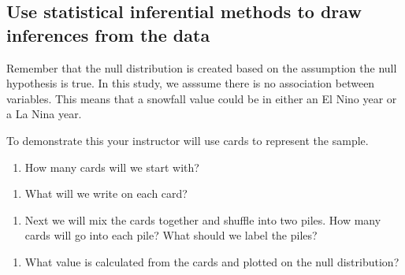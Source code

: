 \documentclass[
]{report}
\providecommand{\tightlist}{%
  \setlength{\itemsep}{0pt}\setlength{\parskip}{0pt}}
\begin{document}
\vspace{0.5in}

\hypertarget{use-statistical-inferential-methods-to-draw-inferences-from-the-data}{%
\subsection{Use statistical inferential methods to draw inferences from the data}\label{use-statistical-inferential-methods-to-draw-inferences-from-the-data}}

Remember that the null distribution is created based on the assumption the null hypothesis is true. In this study, we asssume there is no association between variables. This means that a snowfall value could be in either an El Nino year or a La Nina year.

To demonstrate this your instructor will use cards to represent the sample.

\begin{enumerate}
\def\labelenumi{\arabic{enumi}.}
\setcounter{enumi}{9}
\tightlist
\item
  How many cards will we start with?
\end{enumerate}

\vspace{0.5in}

\begin{enumerate}
\def\labelenumi{\arabic{enumi}.}
\setcounter{enumi}{10}
\tightlist
\item
  What will we write on each card?
\end{enumerate}

\vspace{0.5in}

\begin{enumerate}
\def\labelenumi{\arabic{enumi}.}
\setcounter{enumi}{11}
\tightlist
\item
  Next we will mix the cards together and shuffle into two piles. How many cards will go into each pile? What should we label the piles?
\end{enumerate}

\vspace{1in}

\begin{enumerate}
\def\labelenumi{\arabic{enumi}.}
\setcounter{enumi}{12}
\tightlist
\item
  What value is calculated from the cards and plotted on the null distribution?
\end{enumerate}
\end{document}
